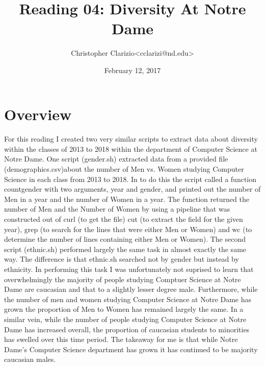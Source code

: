 \documentclass[letterpaper]{article}
\begin{document}

\title{Reading 04: Diversity At Notre Dame}
\date{February 12, 2017}
\author{Christopher Clarizio{\textless}cclarizi@nd.edu{\textgreater}}

\maketitle


\section*{Overview}

\paragraph{}

For this reading I created two very similar scripts to extract data 
about diversity within the classes of 2013 to 2018 within the department 
of Computer Science at Notre Dame. One script (gender.sh) extracted data 
from a provided file (demographics.csv)about the number of Men vs. Women 
studying Computer Science in each class from 2013 to 2018. In to do this
the script called a function countgender with two arguments, year and 
gender, and printed out the number of Men in a year and the number of 
Women in a year. The function returned the number of Men and the Number 
of Women by using a pipeline that was constructed out of curl (to get 
the file) cut (to extract the field for the given year), grep (to search 
for the lines that were either Men or Women) and wc (to determine the 
number of lines containing either Men or Women). The second script 
(ethnic.sh) performed largely the same task in almost exactly the same 
way. The difference is that ethnic.sh searched not by gender but instead 
by ethnicity. In performing this task I was unfortunately not suprised 
to learn that overwhelmingly the majority of people studying Comptuer 
Science at Notre Dame are caucasian and that to a slightly lesser degree 
male. Furthermore, while the number of men and women studying Computer 
Science at Notre Dame has grown the proportion of Men to Women has 
remained largely the same. In a similar vein, while the number of people 
studying Computer Science at Notre Dame has increased overall, the 
proportion of caucasian students to minorities has swelled over this 
time period. The takeaway for me is that while Notre Dame's Computer 
Science department has grown it has continued to be majority caucasian 
males.
\end{document}
